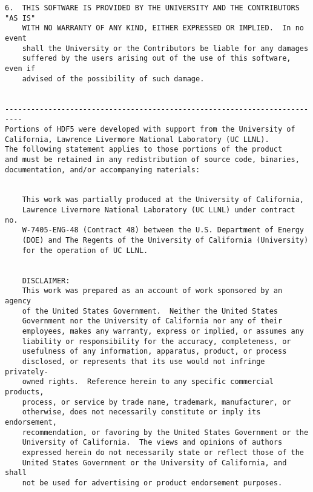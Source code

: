 \begin{verbatim}
6.  THIS SOFTWARE IS PROVIDED BY THE UNIVERSITY AND THE CONTRIBUTORS "AS IS"
    WITH NO WARRANTY OF ANY KIND, EITHER EXPRESSED OR IMPLIED.  In no event
    shall the University or the Contributors be liable for any damages
    suffered by the users arising out of the use of this software, even if
    advised of the possibility of such damage.


--------------------------------------------------------------------------
Portions of HDF5 were developed with support from the University of 
California, Lawrence Livermore National Laboratory (UC LLNL).
The following statement applies to those portions of the product
and must be retained in any redistribution of source code, binaries,
documentation, and/or accompanying materials:


    This work was partially produced at the University of California,
    Lawrence Livermore National Laboratory (UC LLNL) under contract no.
    W-7405-ENG-48 (Contract 48) between the U.S. Department of Energy 
    (DOE) and The Regents of the University of California (University) 
    for the operation of UC LLNL.


    DISCLAIMER:
    This work was prepared as an account of work sponsored by an agency 
    of the United States Government.  Neither the United States 
    Government nor the University of California nor any of their 
    employees, makes any warranty, express or implied, or assumes any 
    liability or responsibility for the accuracy, completeness, or 
    usefulness of any information, apparatus, product, or process 
    disclosed, or represents that its use would not infringe privately-
    owned rights.  Reference herein to any specific commercial products, 
    process, or service by trade name, trademark, manufacturer, or 
    otherwise, does not necessarily constitute or imply its endorsement, 
    recommendation, or favoring by the United States Government or the 
    University of California.  The views and opinions of authors 
    expressed herein do not necessarily state or reflect those of the 
    United States Government or the University of California, and shall 
    not be used for advertising or product endorsement purposes.

\end{verbatim}


